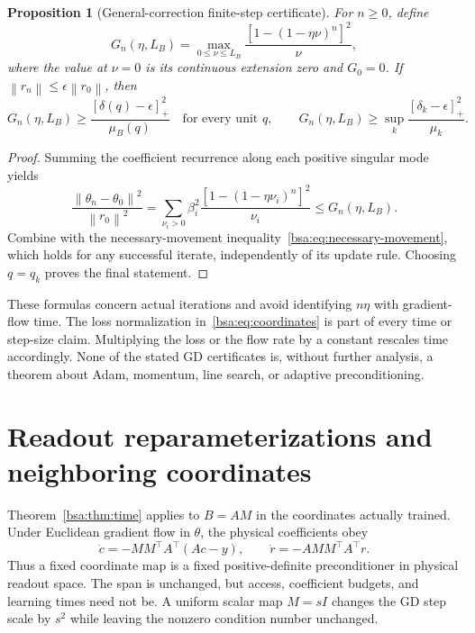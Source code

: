 \documentclass[11pt,letterpaper]{article}
\newcommand{\bsaNorm}[1]{\left\lVert #1\right\rVert}
\newcommand{\bsaPos}[1]{\left[#1\right]_+}
\newtheorem{bsaProposition}{Proposition}[section]
\theoremstyle{remark}
\theoremstyle{plain}
\begin{document}
\begin{bsaProposition}[General-correction finite-step certificate]
\label{bsa:prop:gd-general}
For $n\ge0$, define
\begin{equation}
 G_n(\eta,L_B)=\max_{0\le\nu\le L_B}
 \frac{[1-(1-\eta\nu)^n]^2}{\nu},
 \label{bsa:eq:gn-envelope}
\end{equation}
where the value at $\nu=0$ is its continuous extension zero and $G_0=0$. If
$\bsaNorm{r_n}\le\epsilon\bsaNorm{r_0}$, then
\begin{equation}
 G_n(\eta,L_B)\ge
 \frac{\bsaPos{\delta(q)-\epsilon}^2}{\mu_B(q)}
 \quad\text{for every unit }q,
 \qquad
 G_n(\eta,L_B)\ge\sup_k\frac{\bsaPos{\delta_k-\epsilon}^2}{\mu_k}.
 \label{bsa:eq:gd-general}
\end{equation}
\end{bsaProposition}
\begin{proof}
Summing the coefficient recurrence along each positive singular mode yields
\[
 \frac{\bsaNorm{\theta_n-\theta_0}^2}{\bsaNorm{r_0}^2}
 =\sum_{\nu_i>0}\beta_i^2\frac{[1-(1-\eta\nu_i)^n]^2}{\nu_i}
 \le G_n(\eta,L_B).
\]
Combine with the necessary-movement inequality~\eqref{bsa:eq:necessary-movement}, which holds for any successful iterate, independently of its update rule. Choosing $q=q_k$ proves the final statement.
\end{proof}

These formulas concern actual iterations and avoid identifying $n\eta$ with gradient-flow time. The loss normalization in~\eqref{bsa:eq:coordinates} is part of every time or step-size claim. Multiplying the loss or the flow rate by a constant rescales time accordingly. None of the stated GD certificates is, without further analysis, a theorem about Adam, momentum, line search, or adaptive preconditioning.

\section{Readout reparameterizations and neighboring coordinates}
\label{bsa:sec:reparameterization}

Theorem~\ref{bsa:thm:time} applies to $B=AM$ in the coordinates actually trained. Under Euclidean gradient flow in $\theta$, the physical coefficients obey
\begin{equation}
 \dot c=-MM^\top A^\top(Ac-y),\qquad
 \dot r=-A MM^\top A^\top r.
 \label{bsa:eq:preconditioner}
\end{equation}
Thus a fixed coordinate map is a fixed positive-definite preconditioner in physical readout space. The span is unchanged, but access, coefficient budgets, and learning times need not be. A uniform scalar map $M=sI$ changes the GD step scale by $s^2$ while leaving the nonzero condition number unchanged.
\end{document}
